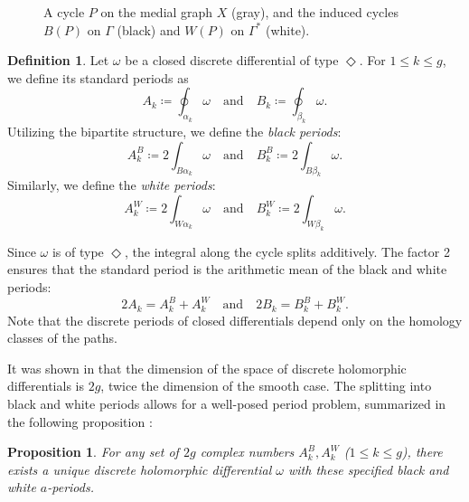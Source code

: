 \documentclass[11pt,a4paper]{article}
\newtheorem{proposition}[theorem]{Proposition}
\theoremstyle{definition}
\newtheorem*{definition}{Definition}
\begin{document}
\begin{figure}[htbp]
	\caption{A cycle $P$ on the medial graph $X$ (gray), and the induced cycles $B(P)$ on $\Gamma$ (black) and $W(P)$ on $\Gamma^*$ (white).}
	\label{fig:contours2}
\end{figure}

\begin{definition}\label{def:blackwhiteperiod}
	Let $\omega$ be a closed discrete differential of type $\Diamond$. For $1 \leq k \leq g$, we define its standard periods as
	\[ A_k \coloneq \oint_{\alpha_k} \omega \quad \text{and} \quad B_k \coloneq \oint_{\beta_k} \omega. \]
	Utilizing the bipartite structure, we define the \textit{black periods}:
	\[ A^B_k \coloneq 2\int_{B\alpha_k} \omega \quad \text{and} \quad B^B_k \coloneq 2\int_{B\beta_k} \omega. \]
	Similarly, we define the \textit{white periods}:
	\[ A^W_k \coloneq 2\int_{W\alpha_k} \omega \quad \text{and} \quad B^W_k \coloneq 2\int_{W\beta_k} \omega. \]
\end{definition}

Since $\omega$ is of type $\Diamond$, the integral along the cycle splits additively. The factor 2 ensures that the standard period is the arithmetic mean of the black and white periods:
\[ 2A_k = A_k^B + A_k^W \quad \text{and} \quad 2B_k = B_k^B + B_k^W. \]
Note that the discrete periods of closed differentials depend only on the homology classes of the paths.

It was shown in \cite{BoG17} that the dimension of the space of discrete holomorphic differentials is $2g$, twice the dimension of the smooth case. The splitting into black and white periods allows for a well-posed period problem, summarized in the following proposition \cite{BoG17}:

\begin{proposition}\label{prop:holomorphic_existence}
	For any set of $2g$ complex numbers $A_k^B, A_k^W$ ($1 \leq k \leq g$), there exists a unique discrete holomorphic differential $\omega$ with these specified black and white $a$-periods.
\end{proposition}
\end{document}
